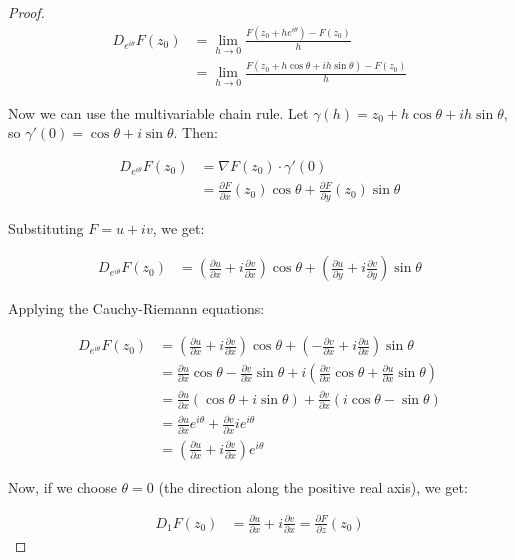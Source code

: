 \begin{proof}
\begin{align}
D_{e^{i\theta}}F(z_0) &= \lim_{h \rightarrow 0} \frac{F(z_0 + he^{i\theta}) - F(z_0)}{h} \\
&= \lim_{h \rightarrow 0} \frac{F(z_0 + h\cos\theta + ih\sin\theta) - F(z_0)}{h}
\end{align}

Now we can use the multivariable chain rule. Let $\gamma(h) = z_0 + h\cos\theta + ih\sin\theta$, so $\gamma'(0) = \cos\theta + i\sin\theta$. Then:

\begin{align}
D_{e^{i\theta}}F(z_0) &= \nabla F(z_0) \cdot \gamma'(0) \\
&= \frac{\partial F}{\partial x}(z_0) \cos\theta + \frac{\partial F}{\partial y}(z_0) \sin\theta
\end{align}

Substituting $F = u + iv$, we get:

\begin{align}
D_{e^{i\theta}}F(z_0) &= \left(\frac{\partial u}{\partial x} + i\frac{\partial v}{\partial x}\right) \cos\theta + \left(\frac{\partial u}{\partial y} + i\frac{\partial v}{\partial y}\right) \sin\theta
\end{align}

Applying the Cauchy-Riemann equations:

\begin{align}
D_{e^{i\theta}}F(z_0) &= \left(\frac{\partial u}{\partial x} + i\frac{\partial v}{\partial x}\right) \cos\theta + \left(-\frac{\partial v}{\partial x} + i\frac{\partial u}{\partial x}\right) \sin\theta \\
&= \frac{\partial u}{\partial x}\cos\theta - \frac{\partial v}{\partial x}\sin\theta + i\left(\frac{\partial v}{\partial x}\cos\theta + \frac{\partial u}{\partial x}\sin\theta\right) \\
&= \frac{\partial u}{\partial x}(\cos\theta + i\sin\theta) + \frac{\partial v}{\partial x}(i\cos\theta - \sin\theta) \\
&= \frac{\partial u}{\partial x}e^{i\theta} + \frac{\partial v}{\partial x}ie^{i\theta} \\
&= \left(\frac{\partial u}{\partial x} + i\frac{\partial v}{\partial x}\right)e^{i\theta}
\end{align}

Now, if we choose $\theta = 0$ (the direction along the positive real axis), we get:

\begin{align}
D_{1}F(z_0) &= \frac{\partial u}{\partial x} + i\frac{\partial v}{\partial x} = \frac{\partial F}{\partial z}(z_0)
\end{align}


\end{proof}
